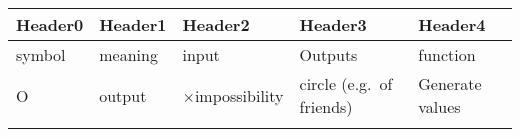 \begin{longtable}[]{@{}lllll@{}}
\toprule
\begin{minipage}[b]{0.17\columnwidth}\raggedright
Header0\strut
\end{minipage} & \begin{minipage}[b]{0.17\columnwidth}\raggedright
Header1\strut
\end{minipage} & \begin{minipage}[b]{0.17\columnwidth}\raggedright
Header2\strut
\end{minipage} & \begin{minipage}[b]{0.17\columnwidth}\raggedright
Header3\strut
\end{minipage} & \begin{minipage}[b]{0.17\columnwidth}\raggedright
Header4\strut
\end{minipage}\tabularnewline
\midrule
\endhead
\begin{minipage}[t]{0.17\columnwidth}\raggedright
symbol\strut
\end{minipage} & \begin{minipage}[t]{0.17\columnwidth}\raggedright
meaning\strut
\end{minipage} & \begin{minipage}[t]{0.17\columnwidth}\raggedright
input\strut
\end{minipage} & \begin{minipage}[t]{0.17\columnwidth}\raggedright
Outputs\strut
\end{minipage} & \begin{minipage}[t]{0.17\columnwidth}\raggedright
function\strut
\end{minipage}\tabularnewline
\begin{minipage}[t]{0.17\columnwidth}\raggedright
O\strut
\end{minipage} & \begin{minipage}[t]{0.17\columnwidth}\raggedright
output\strut
\end{minipage} & \begin{minipage}[t]{0.17\columnwidth}\raggedright
×impossibility\strut
\end{minipage} & \begin{minipage}[t]{0.17\columnwidth}\raggedright
circle (e.g.~of friends)\strut
\end{minipage} & \begin{minipage}[t]{0.17\columnwidth}\raggedright
Generate values\strut
\end{minipage}\tabularnewline
\begin{minipage}[t]{0.17\columnwidth}\raggedright

\end{minipage}
\end{longtable}
